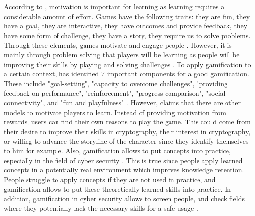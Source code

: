 \documentclass{l4proj}
\begin{document}
According to \citet{hsiao_brief_2007}, motivation is important for learning as learning requires a considerable amount of effort. 
Games have the following traits: they are fun, they have a goal, they are interactive, they have outcomes and provide feedback, they have some form of challenge, 
they have a story, they require us to solve problems. Through these elements, games motivate and engage people \citep{hsiao_brief_2007}. 
However, it is mainly through problem solving that players will be learning as people will be improving their skills by playing and solving challenges \citep{hsiao_brief_2007}.
To apply gamification to a certain context, \citet{cugelman_gamification:_2013} has identified 7 important components for a good gamification. 
These include "goal-setting", "capacity to overcome challenges", "providing feedback on performance", "reinforcement", "progress comparison", "social connectivity", 
and "fun and playfulness" \citep{cugelman_gamification:_2013}. 
However, \citet{nicholson_recipe_2015} claims that there are other models to motivate players to learn. Instead of providing motivation from rewards, 
users can find their own reasons to play the game. This could come from their desire to improve their skills in cryptography, their interest in cryptography, or 
willing to advance the storyline of the character since they identify themselves to him for example.
Also, gamification allows to put concepts into practice, especially in the field of cyber security \citep{wolfenden_gamification_2019}. 
This is true since people apply learned concepts in a potentially real environment which improves knowledge retention. 
People struggle to apply concepts if they are not used in practice, and gamification allows to put these theoretically learned skills into practice.
In addition, gamification in cyber security allows to screen people,
and check fields where they potentially lack the necessary skills for a safe usage \citep{adams_cybersecurity_2015}.
\end{document}
